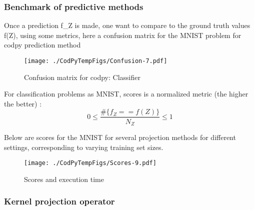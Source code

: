 \documentclass[
]{article}
\def\({}%
\def\){}%
\numberwithin{equation}{section}
\begin{document}
\newpage

\hypertarget{benchmark-of-predictive-methods}{%
\subsubsection{Benchmark of predictive
methods}\label{benchmark-of-predictive-methods}}

Once a prediction \(f_Z\) is made, one want to compare to the ground
truth values \(f(Z)\), using some metrics, here a confusion matrix for
the MNIST problem for codpy prediction method

\begin{figure}
\centering
\texttt{[image: ./CodPyTempFigs/Confusion-7.pdf]}
\caption{Confusion matrix for codpy: Classifier}
\end{figure}

For classification problems as MNIST, scores is a normalized metric (the
higher the better) : \[
  0 \le \frac{\# \{f_Z == f(Z)\}}{N_Z} \le 1
\]

Below are scores for the MNIST for several projection methods for
different settings, corresponding to varying training set sizes.

\begin{figure}
\centering
\texttt{[image: ./CodPyTempFigs/Scores-9.pdf]}
\caption{Scores and execution time}
\end{figure}

\newpage

\hypertarget{kernel-projection-operator}{%
\subsubsection{Kernel projection
operator}\label{kernel-projection-operator}}
\end{document}
